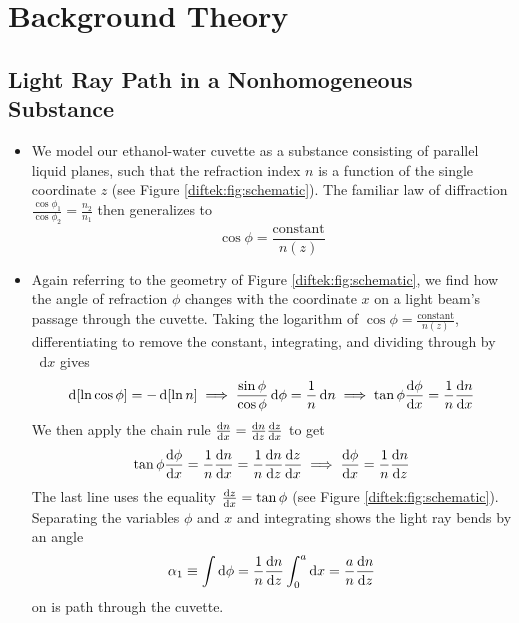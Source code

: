 \documentclass[11pt, a4paper]{article}
\newcommand{\diff}{\mathop{}\!\mathrm{d}} %
\begin{document}
\appendix
\section{Background Theory}

\subsection{Light Ray Path in a Nonhomogeneous Substance}
\begin{itemize}
	\item We model our ethanol-water cuvette as a substance consisting of parallel liquid planes, such that the refraction index $ n $ is a function of the single coordinate $ z $ (see Figure \ref{diftek:fig:schematic}). The familiar law of diffraction $ \frac{\cos \phi_{1}}{\cos \phi_{2}} = \frac{n_{2}}{n_{1}} $ then generalizes to
	\begin{equation*}
		\cos \phi = \frac{\text{constant}}{n(z)}
	\end{equation*}
	
	\item Again referring to the geometry of Figure \ref{diftek:fig:schematic}, we find how the angle of refraction $ \phi $ changes with the coordinate $ x $ on a light beam's passage through the cuvette. Taking the logarithm of $ \cos \phi = \frac{\text{constant}}{n(z)} $, differentiating to remove the constant, integrating, and dividing through by $ \diff x $ gives
	\begin{equation*}
		\diff [\ln \cos \phi] = - \diff [\ln n] \implies \frac{\sin \phi}{\cos \phi}\diff \phi = \frac{1}{n}\diff n \implies \tan \phi \dv{\phi}{x} = \frac{1}{n}\dv{n}{x}
	\end{equation*}
	We then apply the chain rule $ \dv{n}{x} = \dv{n}{z}\dv{z}{x} $ to get
	\begin{align*}
		\tan \phi \dv{\phi}{x} = \frac{1}{n}\dv{n}{x} = \frac{1}{n}\dv{n}{z}\dv{z}{x} \implies \dv{\phi}{x} = \frac{1}{n}\dv{n}{z}
	\end{align*}
	The last line uses the equality $ \dv{z}{x} = \tan \phi $ (see Figure \ref{diftek:fig:schematic}). Separating the variables $ \phi $ and $ x $ and integrating shows the light ray bends by an angle
	\begin{equation*}
		\alpha_{1} \equiv \int \diff \phi =\frac{1}{n} \dv{n}{z} \int_{0}^{a}\diff x =   \frac{a}{n} \dv{n}{z}
	\end{equation*}
	on is path through the cuvette. 
	

\end{itemize}
\end{document}
